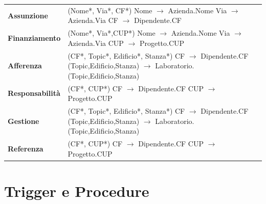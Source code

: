 \begin{xltabular}{\textwidth}{l X}
        \textbf{Assunzione} & (Nome*, Via*, CF*) 
        \newline Nome $\rightarrow$ Azienda.Nome
        \newline Via $\rightarrow$ Azienda.Via 
        \newline CF $\rightarrow$ Dipendente.CF \\

        \textbf{Finanziamento} & (Nome*, Via*,CUP*) 
        \newline Nome $\rightarrow$ Azienda.Nome 
        \newline Via $\rightarrow$ Azienda.Via 
        \newline CUP $\rightarrow$ Progetto.CUP \\

        \textbf{Afferenza} & (CF*, Topic*, Edificio*, Stanza*) 
        \newline CF $\rightarrow$ Dipendente.CF 
        \newline (Topic,Edificio,Stanza) $\rightarrow$ Laboratorio.(Topic,Edificio,Stanza)\\
        
        \textbf{Responsabilità} & (CF*, CUP*)
        \newline CF $\rightarrow$ Dipendente.CF 
        \newline CUP $\rightarrow$ Progetto.CUP \\
        
        \textbf{Gestione} & (CF*, Topic*, Edificio*, Stanza*) 
        \newline CF $\rightarrow$ Dipendente.CF 
        \newline (Topic,Edificio,Stanza) $\rightarrow$ Laboratorio.(Topic,Edificio,Stanza) \\
        
        \textbf{Referenza} & (CF*, CUP*)
        \newline CF $\rightarrow$ Dipendente.CF 
        \newline CUP $\rightarrow$ Progetto.CUP \\

    \end{xltabular}
\endgroup

\section{Trigger e Procedure}
